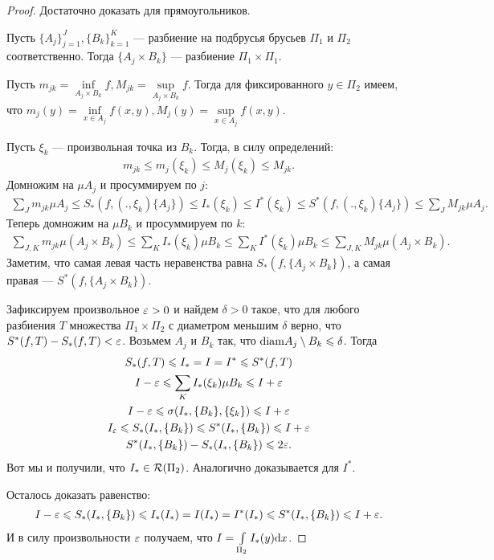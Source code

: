 \begin{proof}
Достаточно доказать для прямоугольников.

Пусть $\{ A_j \}_{j=1}^{J}, \{ B_k \}_{k=1}^K$ --- разбиение на подбрусья брусьев $\Pi_1$ и $\Pi_2$ соответственно. Тогда $\{ A_j \times B_k\}$ --- разбиение $\Pi_1 \times \Pi_1$.

Пусть $m_{jk} = \inf\limits_{A_j \times B_k} f, M_{jk} = \sup\limits_{A_j \times B_k} f$. Тогда для фиксированного $y \in \Pi_2$ имеем, что $m_j(y) = \inf\limits_{x \in A_j} f(x, y), M_j(y) = \sup\limits_{x \in A_j} f(x, y)$.

Пусть $\xi_k$ --- произвольная точка из $B_k$. Тогда, в силу определений:
\begin{gather*}
m_{jk} \leq m_j(\xi_k) \leq M_j(\xi_k) \leq M_{jk}. 
\end{gather*}
Домножим на $\mu A_j$ и просуммируем по $j$:
\begin{gather*}
\sum_J m_{jk} \mu A_j \leq S_*(f, (., \xi_k) \{A_j \}) \leq I_*(\xi_k) \leq I^*(\xi_k) \leq S^*(f, (., \xi_k) \{A_j \}) \leq \sum_J M_{jk} \mu A_j.
\end{gather*}
Теперь домножим на $\mu B_k$ и просуммируем по $k$:
\begin{gather*}
\sum_{J, K} m_{jk} \mu(A_j \times B_k) \leq \sum_K I_*(\xi_k)\mu B_k \leq \sum_K I^*(\xi_k) \mu B_k \leq \sum_{J, K} M_{jk} \mu(A_j \times B_k).
\end{gather*}
Заметим, что самая левая часть неравенства равна $S_*(f, \{A_j \times B_k \})$, а самая правая --- $S^*(f, \{A_j \times B_k \})$.

Зафиксируем произвольное $\varepsilon > 0$ и найдем $\delta > 0$ такое, что для любого разбиения $T$ множества $\Pi_1 \times \Pi_2$ с диаметром меньшим $\delta$ верно, что $S^*(f, T) - S_*(f, T) < \varepsilon$. Возьмем $A_j$ и $B_k$ так, что $\mathrm{diam} A_j \setminus B_k \leqslant \delta$. Тогда
\begin{gather*}
S_*(f, T) \leqslant I_* = I = I^* \leqslant S^*(f, T) \\
I - \varepsilon \leqslant \sum_K I_*(\xi_k) \mu B_k \leqslant I+\varepsilon \\
I - \varepsilon \leqslant \sigma(I_*, \{ B_k \}, \{\xi_k \}) \leqslant I+\varepsilon \\
I_\varepsilon \leqslant S_*(I_*, \{B_k\}) \leqslant S^*(I_*, \{B_k\}) \leqslant I +\varepsilon \\
S^*(I_*, \{B_k\}) - S_*(I_*, \{B_k\}) \leqslant 2\varepsilon.
\end{gather*}
Вот мы и получили, что $I_* \in \mathcal{R}(\Pi_2)$. Аналогично доказывается для $I^*$.

Осталось доказать равенство:
\begin{gather}
I - \varepsilon \leqslant S_*(I_*, \{B_k\}) \leqslant I_*(I_*) = I(I_*) = I^*(I_*) \leqslant  S^*(I_*, \{B_k\}) \leqslant I+\varepsilon.
\end{gather}
И в силу произвольности $\varepsilon$ получаем, что $I = \int\limits_{\Pi_2} I_*(y)\mathrm{d}x$.
\end{proof}


